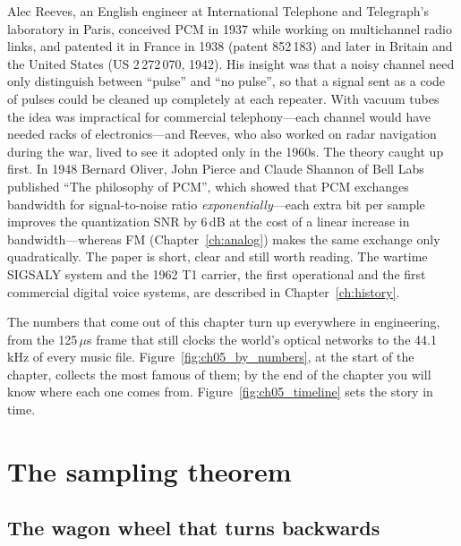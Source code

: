 \begin{history}
Alec Reeves, an English engineer at International Telephone and Telegraph's laboratory in
Paris, conceived PCM in 1937 while working on multichannel radio links, and patented it in
France in 1938 (patent 852\,183) and later in Britain and the United States (US 2\,272\,070,
1942). His insight was that a noisy channel need only distinguish between ``pulse'' and ``no
pulse'', so that a signal sent as a code of pulses could be cleaned up completely at each
repeater. With vacuum tubes the idea was impractical for commercial telephony---each
channel would have needed racks of electronics---and Reeves, who also worked on radar
navigation during the war, lived to see it adopted only in the 1960s. The theory caught up
first. In 1948 Bernard Oliver, John Pierce and Claude Shannon of Bell Labs published ``The
philosophy of PCM'', which showed that PCM exchanges bandwidth for signal-to-noise ratio
\emph{exponentially}---each extra bit per sample improves the quantization SNR by 6\,dB at
the cost of a linear increase in bandwidth---whereas FM (Chapter~\ref{ch:analog}) makes the
same exchange only quadratically. The paper is short, clear and still worth reading. The
wartime SIGSALY system and the 1962 T1 carrier, the first operational and the first
commercial digital voice systems, are described in Chapter~\ref{ch:history}.
\end{history}

The numbers that come out of this chapter turn up everywhere in engineering, from the 125\,$\mu$s
frame that still clocks the world's optical networks to the 44.1\,kHz of every music file.
Figure~\ref{fig:ch05_by_numbers}, at the start of the chapter, collects the most famous of them; by
the end of the chapter you will know where each one comes from. Figure~\ref{fig:ch05_timeline}
sets the story in time.


\section{The sampling theorem}
\label{sec:ch05:sampling}

\subsection{The wagon wheel that turns backwards}

